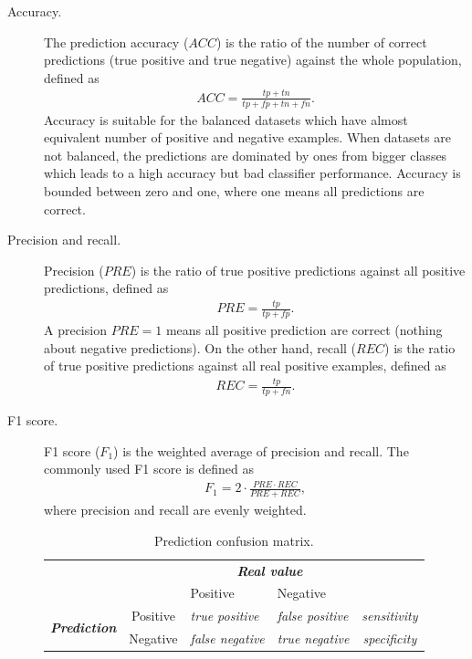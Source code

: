 \documentclass[english]{tktltiki}
\begin{document}
\begin{description}
\item[Accuracy.] The prediction accuracy ($ACC$) is the ratio of the number of correct predictions (true positive and true negative) against the whole population, defined as
\begin{align*}
ACC = \frac{tp + tn}{tp + fp + tn + fn}.
\end{align*}
Accuracy is suitable for the balanced datasets which have almost equivalent number of positive and negative examples. When datasets are not balanced, the predictions are dominated by ones from bigger classes which leads to a high accuracy but bad classifier performance. Accuracy is bounded between zero and one, where one means all predictions are correct.

\item[Precision and recall.] Precision ($PRE$) is the ratio of true positive predictions against all positive predictions, defined as
\begin{align*}
PRE = \frac{tp}{tp + fp}.
\end{align*}
A precision $PRE = 1$ means all positive prediction are correct (nothing about negative predictions). On the other hand, recall ($REC$) is the ratio of true positive predictions against all real positive examples, defined as
\begin{align*}
REC = \frac{tp}{tp + fn}.
\end{align*}


\item[F1 score.] F1 score ($F_1$) is the weighted average of precision and recall. The commonly used F1 score is defined as
\begin{align*}
F_1 = 2 \cdot \frac{PRE \cdot REC}{PRE + REC},
\end{align*}
where precision and recall are evenly weighted.

\begin{center}
\begin{table}
\centering
\begin{tabular}{|c|c|p{2.4cm}|p{2.4cm}|c|}
\cline{1-5}
\multicolumn{2}{|c|}{} & \multicolumn{2}{|c|}{\textbf{\em Real value}} &\\ \cline{3-4}
\multicolumn{2}{|c|}{} & Positive & Negative &\\ \cline{1-5}
\multicolumn{1}{|c|}{\multirow{2}{*}{\textbf{\em Prediction}}} &
\multicolumn{1}{|c|}{Positive} & {\em true positive} & {\em false positive} & {\em sensitivity}    \\ \cline{2-5}
\multicolumn{1}{|c|}{}                        &
\multicolumn{1}{|c|}{Negative} & {\em false negative} & {\em true negative}  & {\em specificity}  \\ \cline{1-5}
\end{tabular}
\caption[Prediction confusion matrix.]{Prediction confusion matrix.}
\label{confusion_matrix}
\end{table}
\end{center} 


\end{description}
\end{document}
